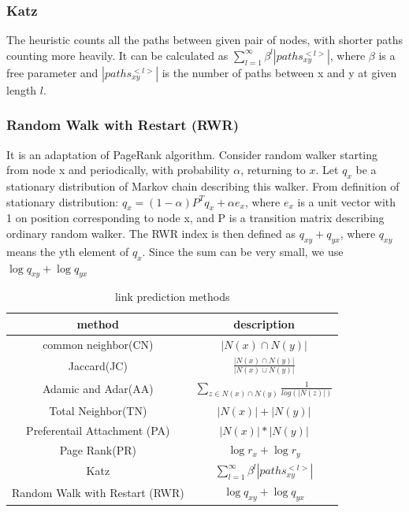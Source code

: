 \documentclass[12pt]{article}
\begin{document}
\subsubsection{Katz}
The heuristic counts all the paths between given pair of nodes, with shorter paths counting more heavily. It can be calculated as $\sum_{l=1}^{\infty}\beta^l|paths_{xy}^{<l>}|$, where $\beta$ is a free parameter and $|paths_{xy}^{<l>}|$ is the number of paths between x and y at given length $l$. 
\subsubsection{Random Walk with Restart (RWR)}
It is an adaptation of PageRank algorithm. Consider random walker starting from node x and periodically, with probability $\alpha$, returning to $x$. Let $q_{x}$ be a stationary distribution of Markov chain describing this walker. From definition of stationary distribution: $q_{x} = (1-\alpha)P^Tq_{x} + \alpha e_{x}$, where $e_{x}$ is a unit vector with 1 on position corresponding to node x, and P is a transition matrix describing ordinary random walker. The RWR index is then defined as $q_{xy} + q_{yx}$, where $q_{xy}$ means the yth element of $q_{x}$. Since the sum can be very small, we use $\log {q_{xy}} + \log {q_{yx}}$


\begin{table}
	\begin{center}
		\begin{tabular}{|c|c|}
			\hline
			method & description \\
			\hline
			common neighbor(CN) & $|N(x) \cap N(y)|$ \\
			Jaccard(JC) & $\frac{|N(x) \cap N(y)|}{|N(x) \cup N(y)|}$ \\
			Adamic and Adar(AA) & $\sum_{z \in N(x) \cap N(y)}{\frac{1}{log(|N(z)|)}}$ \\
			Total Neighbor(TN) & $|N(x)| + |N(y)|$ \\
			Preferentail Attachment (PA) & $|N(x)| * |N(y)|$ \\
			Page Rank(PR)  & $\log{r_x} + \log{r_y}$ \\
			Katz & $\sum_{l=1}^{\infty}\beta^l|paths_{xy}^{<l>}|$\\
			Random Walk with Restart (RWR)& $\log {q_{xy}} + \log {q_{yx}}$\\
			\hline
		\end{tabular}
	\end{center}
	\caption{link prediction methods}
	\label{tab:method}
\end{table}
\end{document}
